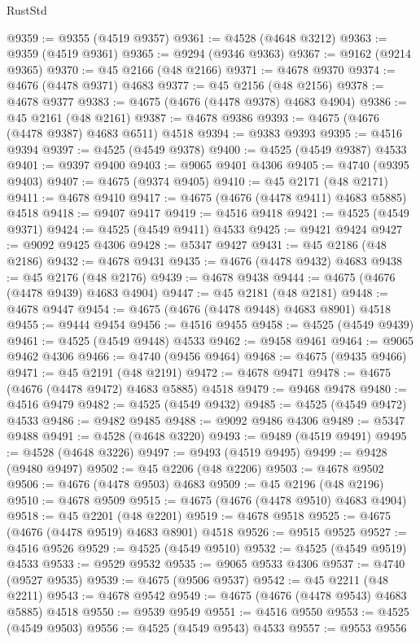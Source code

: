 \begin{lexlean}{RustStd}
\begin{coremodule}
@9359 := @9355 (@4519 @9357)
@9361 := @4528 (@4648 @3212)
@9363 := @9359 (@4519 @9361)
@9365 := @9294 (@9346 @9363)
@9367 := @9162 (@9214 @9365)
@9370 := @45 @2166 (@48 @2166)
@9371 := @4678 @9370
@9374 := @4676 (@4478 @9371) @4683
@9377 := @45 @2156 (@48 @2156)
@9378 := @4678 @9377
@9383 := @4675 (@4676 (@4478 @9378) @4683 @4904)
@9386 := @45 @2161 (@48 @2161)
@9387 := @4678 @9386
@9393 := @4675 (@4676 (@4478 @9387) @4683 @6511) @4518
@9394 := @9383 @9393
@9395 := @4516 @9394
@9397 := @4525 (@4549 @9378)
@9400 := @4525 (@4549 @9387) @4533
@9401 := @9397 @9400
@9403 := @9065 @9401 @4306
@9405 := @4740 (@9395 @9403)
@9407 := @4675 (@9374 @9405)
@9410 := @45 @2171 (@48 @2171)
@9411 := @4678 @9410
@9417 := @4675 (@4676 (@4478 @9411) @4683 @5885) @4518
@9418 := @9407 @9417
@9419 := @4516 @9418
@9421 := @4525 (@4549 @9371)
@9424 := @4525 (@4549 @9411) @4533
@9425 := @9421 @9424
@9427 := @9092 @9425 @4306
@9428 := @5347 @9427
@9431 := @45 @2186 (@48 @2186)
@9432 := @4678 @9431
@9435 := @4676 (@4478 @9432) @4683
@9438 := @45 @2176 (@48 @2176)
@9439 := @4678 @9438
@9444 := @4675 (@4676 (@4478 @9439) @4683 @4904)
@9447 := @45 @2181 (@48 @2181)
@9448 := @4678 @9447
@9454 := @4675 (@4676 (@4478 @9448) @4683 @8901) @4518
@9455 := @9444 @9454
@9456 := @4516 @9455
@9458 := @4525 (@4549 @9439)
@9461 := @4525 (@4549 @9448) @4533
@9462 := @9458 @9461
@9464 := @9065 @9462 @4306
@9466 := @4740 (@9456 @9464)
@9468 := @4675 (@9435 @9466)
@9471 := @45 @2191 (@48 @2191)
@9472 := @4678 @9471
@9478 := @4675 (@4676 (@4478 @9472) @4683 @5885) @4518
@9479 := @9468 @9478
@9480 := @4516 @9479
@9482 := @4525 (@4549 @9432)
@9485 := @4525 (@4549 @9472) @4533
@9486 := @9482 @9485
@9488 := @9092 @9486 @4306
@9489 := @5347 @9488
@9491 := @4528 (@4648 @3220)
@9493 := @9489 (@4519 @9491)
@9495 := @4528 (@4648 @3226)
@9497 := @9493 (@4519 @9495)
@9499 := @9428 (@9480 @9497)
@9502 := @45 @2206 (@48 @2206)
@9503 := @4678 @9502
@9506 := @4676 (@4478 @9503) @4683
@9509 := @45 @2196 (@48 @2196)
@9510 := @4678 @9509
@9515 := @4675 (@4676 (@4478 @9510) @4683 @4904)
@9518 := @45 @2201 (@48 @2201)
@9519 := @4678 @9518
@9525 := @4675 (@4676 (@4478 @9519) @4683 @8901) @4518
@9526 := @9515 @9525
@9527 := @4516 @9526
@9529 := @4525 (@4549 @9510)
@9532 := @4525 (@4549 @9519) @4533
@9533 := @9529 @9532
@9535 := @9065 @9533 @4306
@9537 := @4740 (@9527 @9535)
@9539 := @4675 (@9506 @9537)
@9542 := @45 @2211 (@48 @2211)
@9543 := @4678 @9542
@9549 := @4675 (@4676 (@4478 @9543) @4683 @5885) @4518
@9550 := @9539 @9549
@9551 := @4516 @9550
@9553 := @4525 (@4549 @9503)
@9556 := @4525 (@4549 @9543) @4533
@9557 := @9553 @9556

\end{coremodule}
\end{lexlean}
